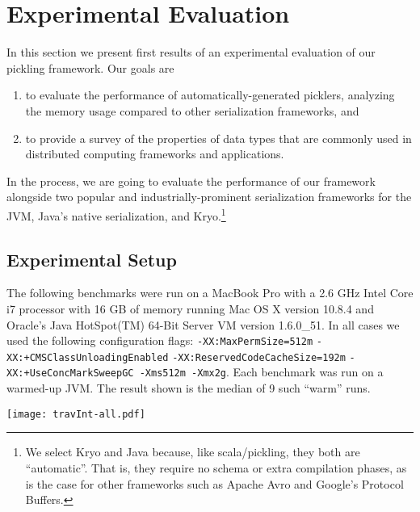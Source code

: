 \section{Experimental Evaluation}
\label{sec:evaluation}

In this section we present first results of an experimental evaluation
of our pickling framework. Our goals are
\begin{enumerate}
\item to evaluate the performance of automatically-generated picklers, analyzing the memory usage
  compared to other serialization frameworks, and
\item to provide a survey of the properties of data types that are
  commonly used in distributed computing frameworks and applications.
\end{enumerate}\noindent
In the process, we are going to evaluate the performance of our
framework alongside two popular and industrially-prominent serialization frameworks
for the JVM, Java's native serialization, and Kryo.\footnote{We select Kryo and Java because, like scala/pickling, they both are ``automatic''. That is, they require no schema or extra compilation phases, as is the case for other frameworks such as Apache Avro and Google's Protocol Buffers.}

\subsection{Experimental Setup}

The following benchmarks were run on a MacBook Pro with a 2.6 GHz
Intel Core i7 processor with 16 GB of memory running Mac OS X version
10.8.4 and Oracle's Java HotSpot(TM) 64-Bit Server VM version
1.6.0\_51. In all cases we used the following configuration flags:
\linebreak \texttt{-XX:MaxPermSize=512m} \texttt{-XX:+CMSClassUnloadingEnabled}
\linebreak
\texttt{-XX:ReservedCodeCacheSize=192m}
\texttt{-XX:+UseConcMarkSweepGC  -Xms512m -Xmx2g}.
Each benchmark was run on a warmed-up JVM. The result shown is the median of 9 such
``warm'' runs.

\begin{figure*}[ht!]
 \centering
 \texttt{[image: travInt-all.pdf]}
 \caption{Results for pickling and unpickling an immutable
   \texttt{Vector[Int]} using different frameworks. Figure~\ref{fig:results-vector}(a) shows the roundtrip pickle/unpickle time as the size of the \texttt{Vector} varies. Figure~\ref{fig:results-vector}(b) shows the amount of free memory available during pickling/unpickling as the size of the \texttt{Vector} varies. Figure~\ref{fig:results-vector}(c) shows the pickled size of \texttt{Vector}.}
 \label{fig:results-vector}
\end{figure*}

